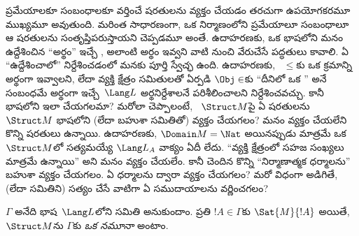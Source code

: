 \documentclass[../../../include/open-logic-section]{subfiles}
\begin{document}


\begin{explain}
ప్రమేయాలకూ సంబంధాలకూ వర్తించే షరతులను వ్యక్తం చేయడం తరచుగా ఉపయోగకరమూ ముఖ్యమూ అవుతుంది.
మరింత సాధారణంగా, ఒక నిర్మాణంలోని ప్రమేయాలూ సంబంధాలూ ఆ షరతులను
సంతృప్తిపరుస్తాయని చెప్పడమూ అంతే. ఉదాహరణకు, ఒక భాషలోని
 మనం ఉద్దేశించిన ``అర్థం'' ఇచ్చే ,
అలాంటి అర్థం ఇవ్వని వాటి నుంచి వేరుచేసే పద్ధతులు కావాలి. ఏ 
``ఉద్దేశించాలో'' నిర్దేశించడంలో మనకు పూర్తి స్వేచ్ఛ ఉంది. ఉదాహరణకు,
~$\le$కు ఒక క్రమాన్ని అర్థంగా ఇవ్వాలని, లేదా వ్యక్తి క్షేత్రం
సమితులతో ఏర్పడి $\Obj \in$కు ``దీనిలో ఒక '' అనే సంబంధమే
అర్థంగా ఇచ్చే~$\Lang L$ అర్థనిర్దేశాలనే పరిశీలించాలని
నిర్దేశించవచ్చు. కానీ భాషలోని  ఇలా చేయగలమా? మరోలా
చెప్పాలంటే, ~$\Struct M$పై ఏ షరతులను~$\Struct M$ భాషలోని
 (లేదా బహుశా  సమితితో) వ్యక్తం చేయగలం?
మనం వ్యక్తం చేయలేని కొన్ని షరతులు ఉన్నాయి. ఉదాహరణకు,
$\Domain M = \Nat$ అయినప్పుడు మాత్రమే ఒక ~$\Struct M$లో సత్యమయ్యే
$\Lang L_A$ వాక్యం ఏదీ లేదు. ``వ్యక్తి క్షేత్రంలో సహజ సంఖ్యలు మాత్రమే ఉన్నాయి''
అని మనం వ్యక్తం చేయలేం. కానీ  చెందిన కొన్ని
``నిర్మాణాత్మక ధర్మాలను'' బహుశా వ్యక్తం చేయగలం.  ఏ
ధర్మాలను  ద్వారా వ్యక్తం చేయగలం? మరో విధంగా అడిగితే,
 (లేదా  సమితిని) సత్యం చేసే వాటిగా ఏ
 సముదాయాలను వర్ణించగలం?
\end{explain}

\begin{defn}[ఒక సమితికి నమూనా]
$\Gamma$ అనేది భాష~$\Lang L$లోని  సమితి అనుకుందాం. ప్రతి
$!A \in \Gamma$కు $\Sat{M}{!A}$ అయితే, ~$\Struct M$ను
$\Gamma$కు \emph{ఒక నమూనా} అంటాం.
\end{defn}
\end{document}
